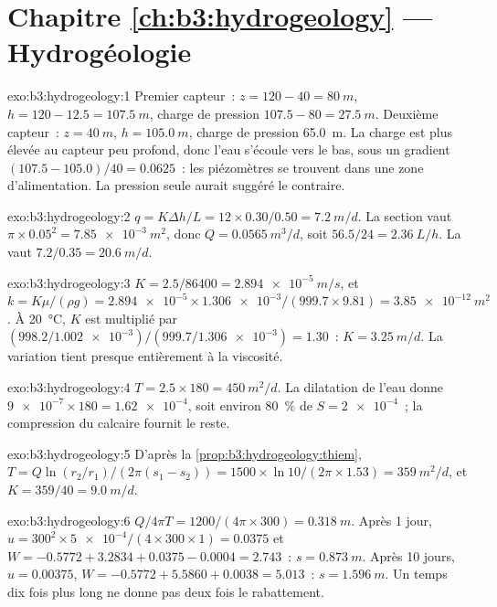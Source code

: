 \section*{Chapitre \ref{ch:b3:hydrogeology} --- Hydrogéologie}

\begin{solution}{exo:b3:hydrogeology:1}
Premier capteur~: $z = 120 - 40 = \qty{80}{m}$, $h = 120 - 12.5 =
\qty{107.5}{m}$, charge de pression $107.5 - 80 = \qty{27.5}{m}$. Deuxième
capteur~: $z = \qty{40}{m}$, $h = \qty{105.0}{m}$, charge de pression
\qty{65.0}{m}. La charge est plus élevée au capteur peu profond, donc l'eau
s'écoule vers le bas, sous un gradient $(107.5 - 105.0)/40 = \num{0.0625}$~:
les piézomètres se trouvent dans une zone d'alimentation. La pression seule aurait
suggéré le contraire.
\end{solution}

\begin{solution}{exo:b3:hydrogeology:2}
$q = K\Delta h/L = 12\times0.30/0.50 = \qty{7.2}{m/d}$. La section vaut
$\pi\times0.05^2 = \qty{7.85e-3}{m^2}$, donc $Q = \qty{0.0565}{m^3/d}$, soit
$56.5/24 = \qty{2.36}{L/h}$. La  vaut $7.2/0.35 =
\qty{20.6}{m/d}$.
\end{solution}

\begin{solution}{exo:b3:hydrogeology:3}
$K = 2.5/86400 = \qty{2.894e-5}{m/s}$, et $k = K\mu/(\rho g) =
\num{2.894e-5}\times\num{1.306e-3}/(999.7\times9.81) =
\qty{3.85e-12}{m^2}$. À \qty{20}{\celsius}, $K$ est multiplié par
$(998.2/\num{1.002e-3})/(999.7/\num{1.306e-3}) = \num{1.30}$~: $K =
\qty{3.25}{m/d}$. La variation tient presque entièrement à la viscosité.
\end{solution}

\begin{solution}{exo:b3:hydrogeology:4}
$T = 2.5\times180 = \qty{450}{m^2/d}$. La dilatation de l'eau donne
$\num{9e-7}\times180 = \num{1.62e-4}$, soit environ \qty{80}{\percent} de $S =
\num{2e-4}$~; la compression du calcaire fournit le reste.
\end{solution}

\begin{solution}{exo:b3:hydrogeology:5}
D'après la \cref{prop:b3:hydrogeology:thiem}, $T = Q\ln(r_2/r_1)/(2\pi(s_1 -
s_2)) = 1500\times\ln10/(2\pi\times1.53) = \qty{359}{m^2/d}$, et $K =
359/40 = \qty{9.0}{m/d}$.
\end{solution}

\begin{solution}{exo:b3:hydrogeology:6}
$Q/4\pi T = 1200/(4\pi\times300) = \qty{0.318}{m}$. Après 1 jour, $u =
300^2\times\num{5e-4}/(4\times300\times1) = \num{0.0375}$ et $W = -0.5772
+ 3.2834 + 0.0375 - 0.0004 = \num{2.743}$~: $s = \qty{0.873}{m}$. Après 10
jours, $u = \num{0.00375}$, $W = -0.5772 + 5.5860 + 0.0038 = \num{5.013}$~:
$s = \qty{1.596}{m}$. Un temps dix fois plus long ne donne pas deux fois
le rabattement.
\end{solution}

